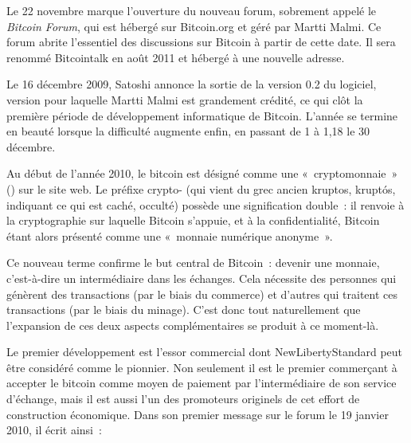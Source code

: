Le 22 novembre marque l'ouverture du nouveau forum, sobrement appelé le \emph{Bitcoin Forum}, qui est hébergé sur Bitcoin.org et géré par Martti Malmi. Ce forum abrite l'essentiel des discussions sur Bitcoin à partir de cette date. Il sera renommé Bitcointalk en août 2011 et hébergé à une nouvelle adresse.

Le 16 décembre 2009, Satoshi annonce la sortie de la version 0.2 du logiciel, version pour laquelle Martti Malmi est grandement crédité, ce qui clôt la première période de développement informatique de Bitcoin. L'année se termine en beauté lorsque la difficulté augmente enfin, en passant de 1 à 1,18 le 30 décembre.

Au début de l'année 2010, le bitcoin est désigné comme une «~cryptomonnaie~» () sur le site web. Le préfixe crypto- (qui vient du grec ancien \foreignlanguage{greek}{kruptos}, kruptós, indiquant ce qui est caché, occulté) possède une signification double~: il renvoie à la cryptographie sur laquelle Bitcoin s'appuie, et à la confidentialité, Bitcoin étant alors présenté comme une «~monnaie numérique anonyme~».

Ce nouveau terme confirme le but central de Bitcoin~: devenir une monnaie, c'est-à-dire un intermédiaire dans les échanges. Cela nécessite des personnes qui génèrent des transactions (par le biais du commerce) et d'autres qui traitent ces transactions (par le biais du minage). C'est donc tout naturellement que l'expansion de ces deux aspects complémentaires se produit à ce moment-là.



Le premier développement est l'essor commercial dont NewLibertyStandard peut être considéré comme le pionnier. Non seulement il est le premier commerçant à accepter le bitcoin comme moyen de paiement par l'intermédiaire de son service d'échange, mais il est aussi l'un des promoteurs originels de cet effort de construction économique. Dans son premier message sur le forum le 19 janvier 2010, il écrit ainsi~:

